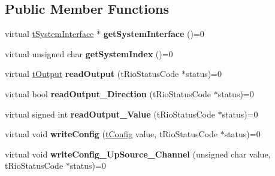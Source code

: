\subsection*{Public Member Functions}
\begin{DoxyCompactItemize}
\item 
\hypertarget{classnFPGA_1_1nFRC__2012__1__6__4_1_1tCounter_ad2c535103dac1a85c6676fec0b52ccfc}{
virtual \hyperlink{classnFPGA_1_1tSystemInterface}{tSystemInterface} $\ast$ {\bfseries getSystemInterface} ()=0}
\label{classnFPGA_1_1nFRC__2012__1__6__4_1_1tCounter_ad2c535103dac1a85c6676fec0b52ccfc}

\item 
\hypertarget{classnFPGA_1_1nFRC__2012__1__6__4_1_1tCounter_a1a9ccd3cfd6c8d0e6d8342b39c9840e9}{
virtual unsigned char {\bfseries getSystemIndex} ()=0}
\label{classnFPGA_1_1nFRC__2012__1__6__4_1_1tCounter_a1a9ccd3cfd6c8d0e6d8342b39c9840e9}

\item 
\hypertarget{classnFPGA_1_1nFRC__2012__1__6__4_1_1tCounter_afb3b5e6224c4c5584004ffba6ae46534}{
virtual \hyperlink{unionnFPGA_1_1nFRC__2012__1__6__4_1_1tCounter_1_1tOutput}{tOutput} {\bfseries readOutput} (tRioStatusCode $\ast$status)=0}
\label{classnFPGA_1_1nFRC__2012__1__6__4_1_1tCounter_afb3b5e6224c4c5584004ffba6ae46534}

\item 
\hypertarget{classnFPGA_1_1nFRC__2012__1__6__4_1_1tCounter_a172cd4889d7779e3677e075567390ab8}{
virtual bool {\bfseries readOutput\_\-Direction} (tRioStatusCode $\ast$status)=0}
\label{classnFPGA_1_1nFRC__2012__1__6__4_1_1tCounter_a172cd4889d7779e3677e075567390ab8}

\item 
\hypertarget{classnFPGA_1_1nFRC__2012__1__6__4_1_1tCounter_a5a2e812ed239a154f3b3830a6343dfa5}{
virtual signed int {\bfseries readOutput\_\-Value} (tRioStatusCode $\ast$status)=0}
\label{classnFPGA_1_1nFRC__2012__1__6__4_1_1tCounter_a5a2e812ed239a154f3b3830a6343dfa5}

\item 
\hypertarget{classnFPGA_1_1nFRC__2012__1__6__4_1_1tCounter_a9dcc577f73572ab0b361498ec2190903}{
virtual void {\bfseries writeConfig} (\hyperlink{unionnFPGA_1_1nFRC__2012__1__6__4_1_1tCounter_1_1tConfig}{tConfig} value, tRioStatusCode $\ast$status)=0}
\label{classnFPGA_1_1nFRC__2012__1__6__4_1_1tCounter_a9dcc577f73572ab0b361498ec2190903}

\item 
\hypertarget{classnFPGA_1_1nFRC__2012__1__6__4_1_1tCounter_adcb932439c291f05e4500689629a7f57}{
virtual void {\bfseries writeConfig\_\-UpSource\_\-Channel} (unsigned char value, tRioStatusCode $\ast$status)=0}
\label{classnFPGA_1_1nFRC__2012__1__6__4_1_1tCounter_adcb932439c291f05e4500689629a7f57}


\end{DoxyCompactItemize}
